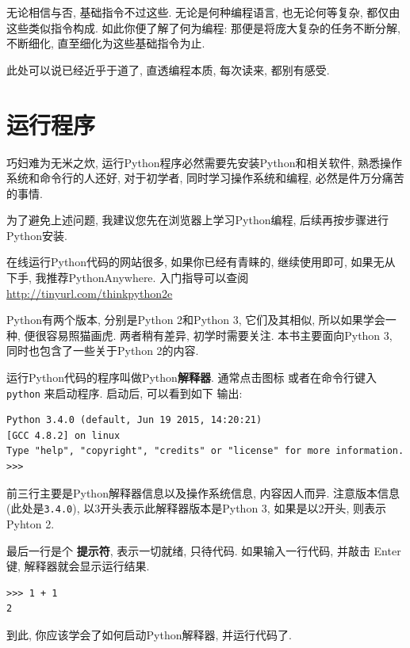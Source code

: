 \documentclass[10pt]{book}
\begin{document}
无论相信与否, 基础指令不过这些. 
无论是何种编程语言, 
也无论何等复杂, 都仅由这些类似指令构成. 
如此你便了解了何为编程: 
那便是将庞大复杂的任务不断分解, 
不断细化, 直至细化为这些基础指令为止. 

\begin{note}
此处可以说已经近乎于道了, 直透编程本质, 每次读来, 都别有感受.
\end{note}

\section{运行程序}

巧妇难为无米之炊, 运行Python程序必然需要先安装Python和相关软件, 
熟悉操作系统和命令行的人还好, 对于初学者, 同时学习操作系统和编程, 
必然是件万分痛苦的事情. 

为了避免上述问题, 
我建议您先在浏览器上学习Python编程, 后续再按步骤进行Python安装. 

在线运行Python代码的网站很多, 
如果你已经有青睐的, 继续使用即可,
如果无从下手, 我推荐PythonAnywhere. 
入门指导可以查阅\url{http://tinyurl.com/thinkpython2e}

Python有两个版本, 分别是Python 2和Python 3, 它们及其相似, 
所以如果学会一种, 便很容易照猫画虎. 两者稍有差异, 初学时需要关注. 
本书主要面向Python 3, 同时也包含了一些关于Python 2的内容. 

运行Python代码的程序叫做Python{\bf 解释器}. 通常点击图标
或者在命令行键入{\tt python} 来启动程序. 启动后, 可以看到如下
输出:

\begin{verbatim}
Python 3.4.0 (default, Jun 19 2015, 14:20:21) 
[GCC 4.8.2] on linux
Type "help", "copyright", "credits" or "license" for more information.
>>> 
\end{verbatim}
%

前三行主要是Python解释器信息以及操作系统信息, 内容因人而异. 
注意版本信息(此处是{\tt 3.4.0}), 以3开头表示此解释器版本是Python 3, 
如果是以2开头, 则表示Pyhton 2. 

最后一行是个 {\bf 提示符}, 表示一切就绪, 只待代码. 
如果输入一行代码, 并敲击 Enter键, 解释器就会显示运行结果. 

\begin{verbatim}
>>> 1 + 1
2
\end{verbatim}
%

到此, 你应该学会了如何启动Python解释器, 并运行代码了. 
\end{document}
